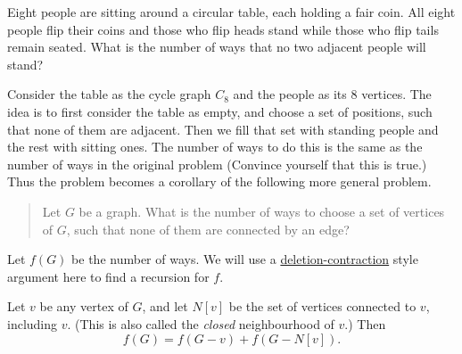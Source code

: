 \begin{question}
    Eight people are sitting around a circular table, each holding a fair coin.
    All eight people flip their coins and those who flip heads stand while
    those who flip tails remain seated. What is the number of ways that no two
    adjacent people will stand?
\end{question}
\begin{solution}
    Consider the table as the cycle graph $C_8$ and the people as its 8
    vertices. The idea is to first consider the table as empty, and choose a
    set of positions, such that none of them are adjacent. Then we fill that
    set with standing people and the rest with sitting ones. The number of ways
    to do this is the same as the number of ways in the original problem
    (Convince yourself that this is true.) Thus the problem becomes a corollary
    of the following more general problem.

    \begin{quote}
        Let $G$ be a graph. What is the number of ways to choose a set of
        vertices of $G$, such that none of them are connected by an edge?
    \end{quote}

    Let $f(G)$ be the number of ways. We will use a \hyperref[teq:
    DC]{deletion-contraction} style argument here to find a recursion for $f$. 

    \begin{claim} 
        Let $v$ be any vertex of $G$, and let $N[v]$ be the set of vertices
        connected to $v$, including $v$. (This is also called the \emph{closed}
        neighbourhood of $v$.) Then
        \[f(G) = f(G - v) + f(G - N[v]).\]
    \end{claim}


\end{solution}
